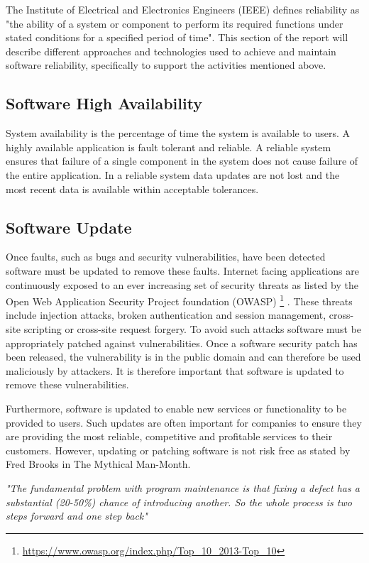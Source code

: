 \documentclass[a4paper,11pt,twoside]{article}
\begin{document}
\noindent
The Institute of Electrical and Electronics Engineers (IEEE) defines reliability as "the ability of a system or component to perform its required functions under stated conditions for a specified period of time". 
This section of the report will describe different approaches and technologies used to achieve and maintain software reliability, specifically to support the activities mentioned above. 

\subsection{Software High Availability }\label{subsec:rules}
System availability is the percentage of time the system is available to users. A highly available application is fault tolerant and reliable. A reliable system ensures that failure of a single component in the system does not cause failure of the entire application. In a reliable system data updates are not lost and the most recent data is available within acceptable tolerances. 


\subsection{Software Update} 

Once faults, such as bugs and security vulnerabilities, have been detected software must be updated to remove these faults. Internet facing applications are continuously exposed to an ever increasing set of security threats as listed by the Open Web Application Security Project foundation (OWASP) \footnote{\url{https://www.owasp.org/index.php/Top_10_2013-Top_10}} . These threats include injection attacks, broken authentication and session management, cross-site scripting or cross-site request forgery. To avoid such attacks software must be appropriately patched against vulnerabilities. Once a software security patch has been released, the vulnerability is in the public domain and can therefore be used maliciously by attackers. It is therefore important that software is updated to remove these vulnerabilities.

Furthermore, software is updated to enable new services or functionality to be provided to users. Such updates are often important for companies to ensure they are providing the most reliable, competitive and profitable services to their customers. However, updating or patching software is not risk free as stated by Fred Brooks in The Mythical Man-Month.\bigskip

\noindent\textit{ "The fundamental problem with program maintenance is that fixing a defect has a substantial (20-50\%) chance of introducing another. So the whole process is two steps forward and one step back"}  
\end{document}
